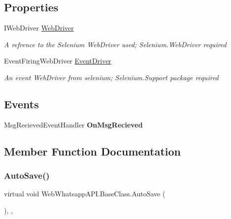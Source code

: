 \subsection*{Properties}
\begin{DoxyCompactItemize}
\item 
I\+Web\+Driver \hyperlink{class_web_whatsapp_a_p_i_1_1_base_class_afc0c364092139747b980a1ad6b1e2321}{Web\+Driver}
\begin{DoxyCompactList}\small\item\em A refrence to the Selenium Web\+Driver used; Selenium.\+Web\+Driver required \end{DoxyCompactList}\item 
Event\+Firing\+Web\+Driver \hyperlink{class_web_whatsapp_a_p_i_1_1_base_class_a1db62394318cea6839e32f2820fb426f}{Event\+Driver}
\begin{DoxyCompactList}\small\item\em An event Web\+Driver from selenium; Selenium.\+Support package required \end{DoxyCompactList}\end{DoxyCompactItemize}
\subsection*{Events}
\begin{DoxyCompactItemize}
\item 
\mbox{\label{class_web_whatsapp_a_p_i_1_1_base_class_a5baefb689c909b3db1816d274ea9596b}} 
Msg\+Recieved\+Event\+Handler {\bfseries On\+Msg\+Recieved}
\end{DoxyCompactItemize}


\subsection{Member Function Documentation}
\mbox{\label{class_web_whatsapp_a_p_i_1_1_base_class_a56a2f1cfc0bef6cad2aae521e9c4d20a}} 
\subsubsection{\texorpdfstring{Auto\+Save()}{AutoSave()}}
{\footnotesize\ttfamily virtual void Web\+Whatsapp\+A\+P\+I.\+Base\+Class.\+Auto\+Save (\begin{DoxyParamCaption}{ }\end{DoxyParamCaption})\hspace{0.3cm}{\ttfamily [inline]}, {\ttfamily [protected]}, {\ttfamily [virtual]}}



